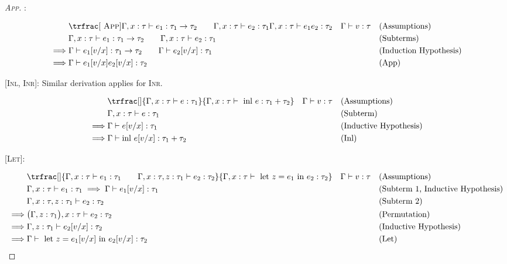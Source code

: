\documentclass[nonacm]{acmart}
\newcommand{\inl}[1]{\text{inl } #1}
\begin{document}
\begin{proof}
  [\textsc{App}]:

  \vspace*{-1em}
  \begin{align*}
    &  \trfrac[~\textsc{App}]{\Gamma, x : \tau \vdash e_1 : \tau_1 \rightarrow \tau_2 \qquad \Gamma, x : \tau \vdash e_{2} : \tau_1}{\Gamma, x : \tau \vdash e_{1} e_{2} : \tau_2} \quad \Gamma \vdash v : \tau  && \text{(Assumptions)} \\
    & \Gamma, x : \tau \vdash e_1 : \tau_1 \rightarrow \tau_2 \qquad \Gamma, x : \tau \vdash e_{2} : \tau_1 && \text{(Subterms)} \\
    \implies & \Gamma \vdash e_1[v/x] : \tau_1 \rightarrow \tau_2 \qquad \Gamma \vdash e_2[v/x] : \tau_1 && \text{(Induction Hypothesis)} \\
    \implies & \Gamma \vdash e_{1}[v/x] e_{2}[v/x] : \tau_2 && \text{(App)}
  \end{align*}


  [\textsc{Inl, Inr}]: Similar derivation applies for \textsc{Inr}.

  \vspace*{-1em}
  \begin{align*}
    & \trfrac[]{\Gamma, x : \tau \vdash e : \tau_1}{\Gamma, x : \tau \vdash \text{ inl } e : \tau_1 + \tau_2}  \quad \Gamma \vdash v : \tau && \text{(Assumptions)} \\
    & \Gamma, x : \tau \vdash e : \tau_1 && \text{(Subterm)} \\
    \implies & \Gamma \vdash e[v/x] : \tau_1 && \text{(Inductive Hypothesis)} \\
    \implies & \Gamma \vdash \inl{e[v/x]} : \tau_1 + \tau_2 && \text{(Inl)}
  \end{align*}

  [\textsc{Let}]:

  \vspace*{-1em}
  \begin{align*}
    & \trfrac[]{\Gamma, x : \tau \vdash e_1 : \tau_1 \qquad \Gamma, x : \tau, z : \tau_1 \vdash e_2
      : \tau_2}{\Gamma, x : \tau \vdash \text{ let } z = e_1 \text{ in } e_2 : \tau_2}
      \quad \Gamma \vdash v : \tau  && \text{(Assumptions)} \\
    & \Gamma, x : \tau \vdash e_1 : \tau_1 \implies \Gamma \vdash e_1[v/x] : \tau_1 && \text{(Subterm 1, Inductive Hypothesis)} \\
    & \Gamma, x : \tau, z : \tau_1 \vdash e_2 : \tau_2 && \text{(Subterm 2)} \\
    \implies & \big(\Gamma, z : \tau_1\big), x : \tau \vdash e_2 : \tau_2 && \text{(Permutation)} \\
    \implies & \Gamma, z : \tau_1 \vdash e_2[v/x] : \tau_2 && \text{(Inductive Hypothesis)} \\
    \implies & \Gamma \vdash \text{ let } z = e_1[v/x] \text{ in } e_2[v/x] : \tau_2 && \text{(Let)}
  \end{align*}



\end{proof}
\end{document}
